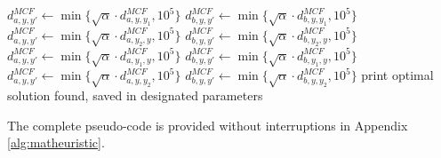 \documentclass[../thesis.tex]{subfiles}
\begin{document}
\begin{algorithm}[H]
\begin{algorithmic}
    \STATE $d^{MCF}_{a,y,y'}\gets\min\{\sqrt\alpha\cdot d^{MCF}_{a,y,y_1},10^5\}$
    \STATE $d^{MCF}_{b,y,y'}\gets\min\{\sqrt\alpha\cdot d^{MCF}_{b,y,y_1},10^5\}$    
    \STATE $d^{MCF}_{a,y,y'}\gets\min\{\sqrt\alpha\cdot d^{MCF}_{a,y_2,y},10^5\}$
    \STATE $d^{MCF}_{b,y,y'}\gets\min\{\sqrt\alpha\cdot d^{MCF}_{b,y_2,y},10^5\}$
    \ENDFOR
    \STATE $d^{MCF}_{a,y,y'}\gets\min\{\sqrt\alpha\cdot d^{MCF}_{a,y_1,y},10^5\}$
    \STATE $d^{MCF}_{b,y,y'}\gets\min\{\sqrt\alpha\cdot d^{MCF}_{b,y_1,y},10^5\}$    
    \STATE $d^{MCF}_{a,y,y'}\gets\min\{\sqrt\alpha\cdot d^{MCF}_{a,y,y_2},10^5\}$
    \STATE $d^{MCF}_{b,y,y'}\gets\min\{\sqrt\alpha\cdot d^{MCF}_{b,y,y_2},10^5\}$
    \ENDFOR
    \ENDFOR
    \ENDIF
    \ENDIF
    \ENDWHILE
    \STATE print optimal solution found, saved in designated parameters

    \end{algorithmic}
    \end{algorithm}

The complete pseudo-code is provided without interruptions in Appendix \ref{alg:matheuristic}.
\end{document}
